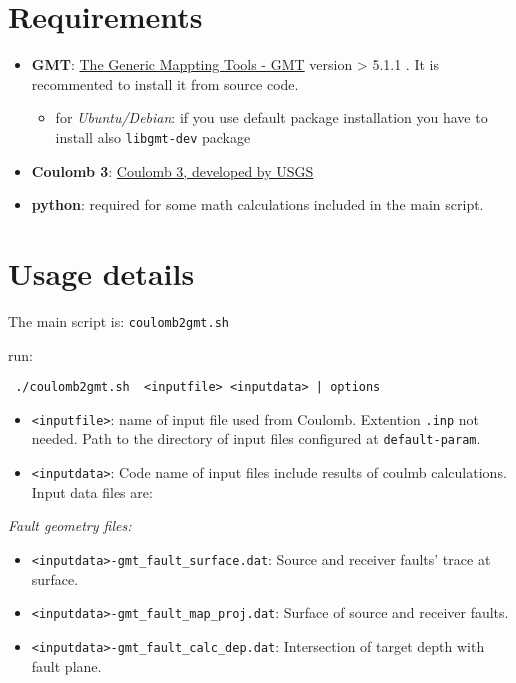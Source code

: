 \section{Requirements}\label{requirements}

\begin{itemize}
\item
  \textbf{GMT}: \href{http://gmt.soest.hawaii.edu/}{The Generic Mappting
  Tools - GMT} version \textgreater{} 5.1.1 . It is recommented to
  install it from source code.

  \begin{itemize}
  \item
    for \emph{Ubuntu/Debian}: if you use default package installation
    you have to install also \texttt{libgmt-dev} package
  \end{itemize}
\item
  \textbf{Coulomb 3}:
  \href{https://earthquake.usgs.gov/research/software/coulomb/}{Coulomb
  3, developed by USGS}
\item
  \textbf{python}: required for some math calculations included in the
  main script.
\end{itemize}

\section{Usage details}\label{usage-details}

The main script is: \texttt{coulomb2gmt.sh}

run:

\begin{verbatim}
 ./coulomb2gmt.sh  <inputfile> <inputdata> | options
\end{verbatim}

\begin{itemize}
\item
  \texttt{\textless{}inputfile\textgreater{}}: name of input file used
  from Coulomb. Extention \texttt{.inp} not needed. Path to the
  directory of input files configured at \texttt{default-param}.
\item
  \texttt{\textless{}inputdata\textgreater{}}: Code name of input files
  include results of coulmb calculations. Input data files are:
\end{itemize}

\emph{Fault geometry files:}

\begin{itemize}
\item
  \texttt{\textless{}inputdata\textgreater{}-gmt\_fault\_surface.dat}:
  Source and receiver faults' trace at surface.
\item
  \texttt{\textless{}inputdata\textgreater{}-gmt\_fault\_map\_proj.dat}:
  Surface of source and receiver faults.
\item
  \texttt{\textless{}inputdata\textgreater{}-gmt\_fault\_calc\_dep.dat}:
  Intersection of target depth with fault plane.
\end{itemize}

